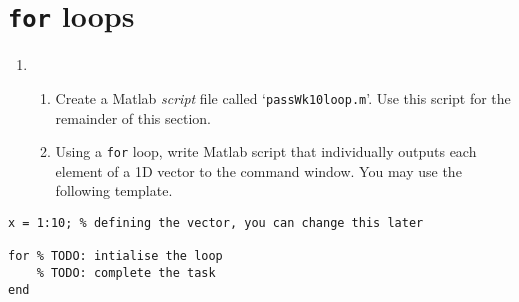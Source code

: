 \documentclass{pass}
\begin{document}
\section*{\texttt{for} loops}
\begin{enumerate}[resume]
\item
	\begin{enumerate}
	\item Create a Matlab \textit{script} file called `\texttt{passWk10loop.m}'. Use this script for the remainder of this section.\\
	
	\item Using a \texttt{for} loop, write Matlab script that individually outputs each element of a 1D vector to the command window. You may use the following template.
	\end{enumerate}
\end{enumerate}
\begin{lstlisting}[style=Matlab]
x = 1:10; % defining the vector, you can change this later

for % TODO: intialise the loop
	% TODO: complete the task
end
\end{lstlisting}
\end{document}

